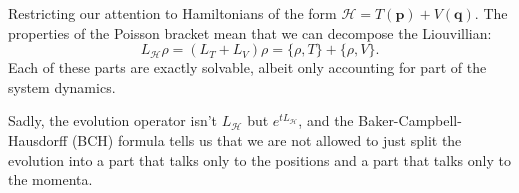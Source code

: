 \documentclass{article}
\begin{document}
Restricting our attention to Hamiltonians of the form $\mathcal{H} = T(\mathbf{p}) + V(\mathbf{q})$. The properties of the Poisson bracket mean that we can decompose the Liouvillian:
\begin{equation}
    L_{\mathcal{H}} \rho = (L_T+L_V)\rho = \{ \rho, T \} + \{ \rho, V \}.
\end{equation}
Each of these parts are exactly solvable, albeit only accounting for part of the system dynamics.

Sadly, the evolution operator isn't $L_{\mathcal{H}}$ but $e^{t L_{\mathcal{H}}}$, and the Baker-Campbell-Hausdorff (BCH) formula tells us that we are not allowed to just split the evolution into a part that talks only to the positions and a part that talks only to the momenta.
\end{document}
